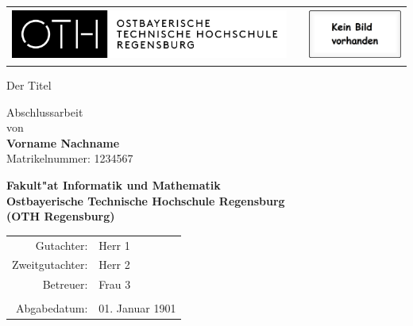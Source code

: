 %
%

\begin{titlepage}


\FloatBarrier
\begin{table}[htb]\vspace{1ex}\centering
\begin{tabular}{ccc}
 \includegraphics[height=1.7cm]{img/logo_OTH.png}
   &    &
 \includegraphics[height=1.7cm]{img/kein_bild_vorhanden.eps}
   \\
\end{tabular}
\end{table}
\FloatBarrier


\begin{center}
\rule{0pt}{0pt}
\vfill
\vfill
\vfill
\vfill

\begin{huge}
Der Titel  \\[0.75ex]
\end{huge}

\vfill
\vfill

Abschlussarbeit\\ von\\

\vspace*{.5cm}
\textbf{Vorname Nachname}\\
Matrikelnummer: 1234567
\vspace{.5cm}

\vfill
\vfill
\textbf{\large Fakult"at Informatik und Mathematik\\
Ostbayerische Technische Hochschule Regensburg\\
(OTH Regensburg)}
\vfill
\vfill

\begin{tabular}{rl}
Gutachter:   & Herr 1\\
Zweitgutachter:   & Herr 2\\
Betreuer:   & Frau 3\\
\\Abgabedatum:& 01. Januar 1901
\end{tabular}
\end{center}
\end{titlepage}

